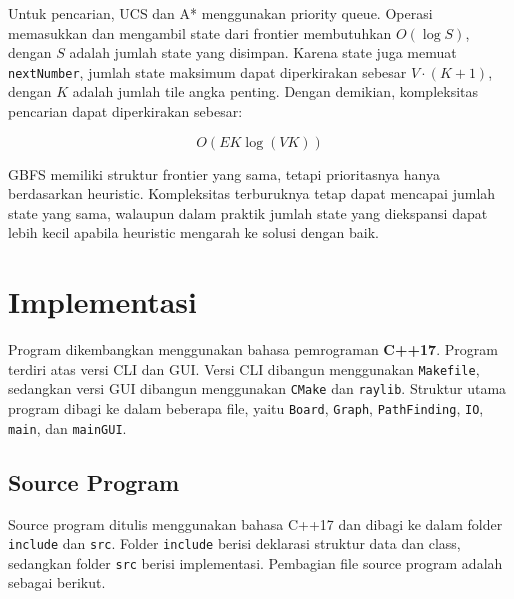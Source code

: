 \documentclass[a4paper,11pt]{article}
\begin{document}
Untuk pencarian, UCS dan A* menggunakan priority queue. Operasi memasukkan dan mengambil state dari frontier membutuhkan $O(\log S)$, dengan $S$ adalah jumlah state yang disimpan. Karena state juga memuat \texttt{nextNumber}, jumlah state maksimum dapat diperkirakan sebesar $V \cdot (K + 1)$, dengan $K$ adalah jumlah tile angka penting. Dengan demikian, kompleksitas pencarian dapat diperkirakan sebesar:

\[
O(EK \log(VK))
\]

GBFS memiliki struktur frontier yang sama, tetapi prioritasnya hanya berdasarkan heuristic. Kompleksitas terburuknya tetap dapat mencapai jumlah state yang sama, walaupun dalam praktik jumlah state yang diekspansi dapat lebih kecil apabila heuristic mengarah ke solusi dengan baik.

\section{Implementasi}
Program dikembangkan menggunakan bahasa pemrograman \textbf{C++17}. Program terdiri atas versi CLI dan GUI. Versi CLI dibangun menggunakan \texttt{Makefile}, sedangkan versi GUI dibangun menggunakan \texttt{CMake} dan \texttt{raylib}. Struktur utama program dibagi ke dalam beberapa file, yaitu \texttt{Board}, \texttt{Graph}, \texttt{PathFinding}, \texttt{IO}, \texttt{main}, dan \texttt{mainGUI}.

\subsection{Source Program}
Source program ditulis menggunakan bahasa C++17 dan dibagi ke dalam folder \texttt{include} dan \texttt{src}. Folder \texttt{include} berisi deklarasi struktur data dan class, sedangkan folder \texttt{src} berisi implementasi. Pembagian file source program adalah sebagai berikut.
\end{document}
